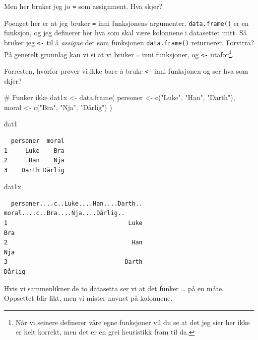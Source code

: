 \documentclass[
  letterpaper,
  DIV=11,
  numbers=noendperiod]{scrartcl}
\newenvironment{Shaded}{\begin{snugshade}}{\end{snugshade}}
\newcommand{\CommentTok}[1]{\textcolor[rgb]{0.37,0.37,0.37}{#1}}
\newcommand{\FunctionTok}[1]{\textcolor[rgb]{0.28,0.35,0.67}{#1}}
\newcommand{\NormalTok}[1]{\textcolor[rgb]{0.00,0.23,0.31}{#1}}
\newcommand{\OtherTok}[1]{\textcolor[rgb]{0.00,0.23,0.31}{#1}}
\newcommand{\StringTok}[1]{\textcolor[rgb]{0.13,0.47,0.30}{#1}}
\begin{document}
Men her bruker jeg jo \texttt{=} som assignment. Hva skjer?

Poenget her er at jeg bruker \texttt{=} inni funksjonens argumenter.
\texttt{data.frame()} er en funksjon, og jeg definerer her hva som skal
være kolonnene i datasettet mitt. Så bruker jeg \texttt{\textless{}-}
til å \emph{assigne} det som funksjonen \texttt{data.frame()}
returnerer. Forvirra? På generelt grunnlag kan vi si at vi bruker
\texttt{=} inni funksjoner, og \texttt{\textless{}-} utafor\footnote{Når
  vi seinere definerer våre egne funksjoner vil du se at det jeg sier
  her ikke er helt korrekt, men det er en grei heuristikk fram til da.}.

Forresten, hvorfor prøver vi ikke bare å bruke \texttt{\textless{}-}
inni funksjonen og ser hva som skjer?

\begin{Shaded}
\begin{Highlighting}[]
\CommentTok{\# Funker ikke}
\NormalTok{dat1x }\OtherTok{\textless{}{-}} \FunctionTok{data.frame}\NormalTok{(}
\NormalTok{  personer }\OtherTok{\textless{}{-}} \FunctionTok{c}\NormalTok{(}\StringTok{"Luke"}\NormalTok{, }\StringTok{"Han"}\NormalTok{, }\StringTok{"Darth"}\NormalTok{),}
\NormalTok{  moral }\OtherTok{\textless{}{-}} \FunctionTok{c}\NormalTok{(}\StringTok{"Bra"}\NormalTok{, }\StringTok{"Nja"}\NormalTok{, }\StringTok{"Dårlig"}\NormalTok{)}
\NormalTok{)}

\NormalTok{dat1}
\end{Highlighting}
\end{Shaded}

\begin{verbatim}
  personer  moral
1     Luke    Bra
2      Han    Nja
3    Darth Dårlig
\end{verbatim}

\begin{Shaded}
\begin{Highlighting}[]
\NormalTok{dat1x}
\end{Highlighting}
\end{Shaded}

\begin{verbatim}
  personer....c..Luke....Han....Darth.. moral....c..Bra....Nja....Dårlig..
1                                  Luke                                Bra
2                                   Han                                Nja
3                                 Darth                             Dårlig
\end{verbatim}

Hvis vi sammenlikner de to datasetta ser vi at det funker \ldots{} på en
måte. Oppsettet blir likt, men vi mister navnet på kolonnene.
\end{document}

